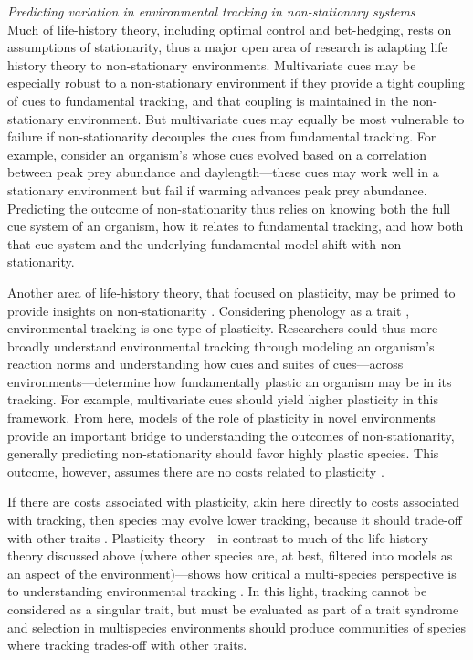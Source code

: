 \documentclass[11pt,letterpaper]{article}
\begin{document}
\emph{Predicting variation in environmental tracking in non-stationary systems}\\
Much of life-history theory, including optimal control and bet-hedging, rests on assumptions of stationarity, thus a major open area of research is adapting life history theory to non-stationary environments. Multivariate cues may be especially robust to a non-stationary environment if they provide a tight coupling of cues to fundamental tracking, and that coupling is maintained in the non-stationary environment. But multivariate cues may equally be most vulnerable to failure if non-stationarity decouples the cues from fundamental tracking. For example, consider an organism's whose cues evolved based on a correlation between peak prey abundance and daylength---these cues may work well in a stationary environment but fail if warming advances peak prey abundance. Predicting the outcome of non-stationarity thus relies on knowing both the full cue system of an organism, how it relates to fundamental tracking, and how both that cue system and the underlying fundamental model shift with non-stationarity. 

Another area of life-history theory, that focused on plasticity, may be primed to provide insights on non-stationarity \citep[or `sustained environmental change,' see][]{chevin2010}. Considering phenology as a trait \citep[as we and others do, e.g.,][]{charm2008,nicotra2010,inouye2019}, environmental tracking is one type of plasticity. Researchers could thus more broadly understand environmental tracking through modeling an organism's reaction norms \citep{pigluicci1998,chmura2019} and understanding how cues and suites of cues---across environments---determine how fundamentally plastic an organism may be in its tracking. For example, multivariate cues should yield higher plasticity in this framework. From here, models of the role of plasticity in novel environments provide an important bridge to understanding the outcomes of non-stationarity, generally predicting non-stationarity should favor highly plastic species. This outcome, however, assumes there are no costs related to plasticity \citep{Ghalambor2007,tufto2015}. 

If there are costs associated with plasticity, akin here directly to costs associated with tracking, then species may evolve lower tracking, because it should trade-off with other traits \citep{auld2010}. Plasticity theory---in contrast to much of the life-history theory discussed above (where other species are, at best, filtered into models as an aspect of the environment)---shows how critical a multi-species perspective is to understanding environmental tracking \citep{metcalf2015}. In this light, tracking cannot be considered as a singular trait, but must be evaluated as part of a trait syndrome \citep[or mosaic of traits,][]{Ghalambor2007} and selection in multispecies environments should produce communities of species where tracking trades-off with other traits. 
\end{document}

